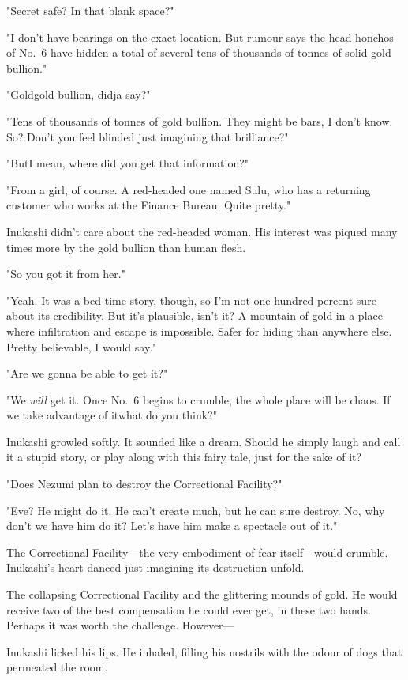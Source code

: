 "Secret safe? In that blank space?"

"I don't have bearings on the exact location. But rumour says the head
honchos of No.~6 have hidden a total of several tens of thousands of
tonnes of solid gold bullion."

"Gold\el gold bullion, didja say?"

"Tens of thousands of tonnes of gold bullion. They might be bars, I
don't know. So? Don't you feel blinded just imagining that brilliance?"

"But\el I mean, where did you get that information?"

"From a girl, of course. A red-headed one named Sulu, who has a
returning customer who works at the Finance Bureau. Quite pretty."

Inukashi didn't care about the red-headed woman. His interest was piqued
many times more by the gold bullion than human flesh.

"So you got it from her."

"Yeah. It was a bed-time story, though, so I'm not one-hundred percent
sure about its credibility. But it's plausible, isn't it? A mountain of
gold in a place where infiltration and escape is impossible. Safer for
hiding than anywhere else. Pretty believable, I would say."

"Are we gonna be able to get it?"

"We \emph{will} get it. Once No.~6 begins to crumble, the whole place will be
chaos. If we take advantage of it\el what do you think?"

Inukashi growled softly. It sounded like a dream. Should he simply laugh
and call it a stupid story, or play along with this fairy tale, just for
the sake of it?

"Does Nezumi plan to destroy the Correctional Facility?"

"Eve? He might do it. He can't create much, but he can sure destroy. No,
why don't we have him do it? Let's have him make a spectacle out of it."

The Correctional Facility---the very embodiment of fear itself---would
crumble. Inukashi's heart danced just imagining its destruction unfold.

The collapsing Correctional Facility and the glittering mounds of gold.
He would receive two of the best compensation he could ever get, in
these two hands. Perhaps it was worth the challenge. However---

Inukashi licked his lips. He inhaled, filling his nostrils with the
odour of dogs that permeated the room.

